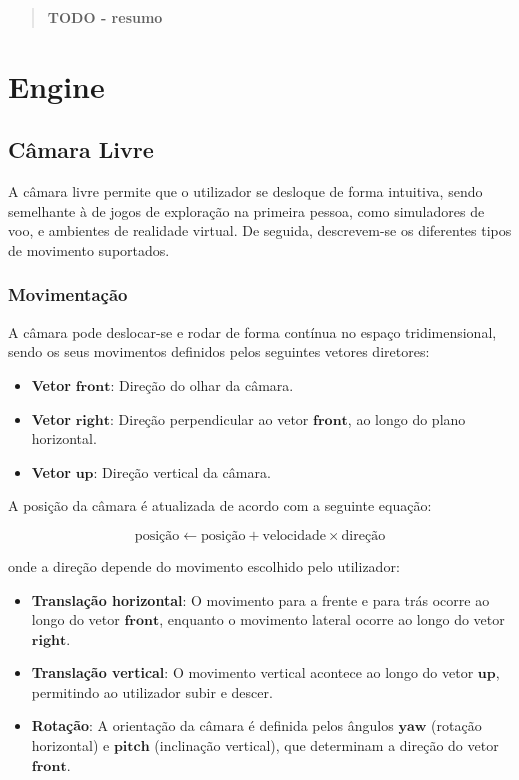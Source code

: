 \documentclass[12pt, a4paper]{article}
\begin{document}
\pagebreak

\begin{abstract}
    \textbf{\color{red} TODO - resumo}
\end{abstract}

\section{Engine}

\subsection{Câmara Livre}

A câmara livre permite que o utilizador se desloque de forma intuitiva, sendo semelhante à de
jogos de exploração na primeira pessoa, como simuladores de voo, e ambientes de realidade
virtual.
De seguida, descrevem-se os diferentes tipos de movimento suportados.

\subsubsection{Movimentação}

A câmara pode deslocar-se e rodar de forma contínua no espaço tridimensional, sendo os seus
movimentos definidos pelos seguintes vetores diretores:

\begin{itemize}
    \item \textbf{Vetor} $\mathbf{front}$: Direção do olhar da câmara.
    \item \textbf{Vetor} $\mathbf{right}$: Direção perpendicular ao vetor $\mathbf{front}$, ao
          longo do plano horizontal.
    \item \textbf{Vetor} $\mathbf{up}$: Direção vertical da câmara.
\end{itemize}

A posição da câmara é atualizada de acordo com a seguinte equação:

\[
\text{posição} \gets \text{posição} + \text{velocidade} \times \text{direção}
\]

onde a direção depende do movimento escolhido pelo utilizador:

\begin{itemize}
    \item \textbf{Translação horizontal}: O movimento para a frente e para trás ocorre ao longo
          do vetor $\mathbf{front}$, enquanto o movimento lateral ocorre ao longo do vetor
          $\mathbf{right}$.
    \item \textbf{Translação vertical}: O movimento vertical acontece ao longo do vetor
          $\mathbf{up}$, permitindo ao utilizador subir e descer.
    \item \textbf{Rotação}: A orientação da câmara é definida pelos ângulos $\mathbf{yaw}$
          (rotação horizontal) e $\mathbf{pitch}$ (inclinação vertical), que determinam a direção
          do vetor $\mathbf{front}$.
\end{itemize}
\end{document}
